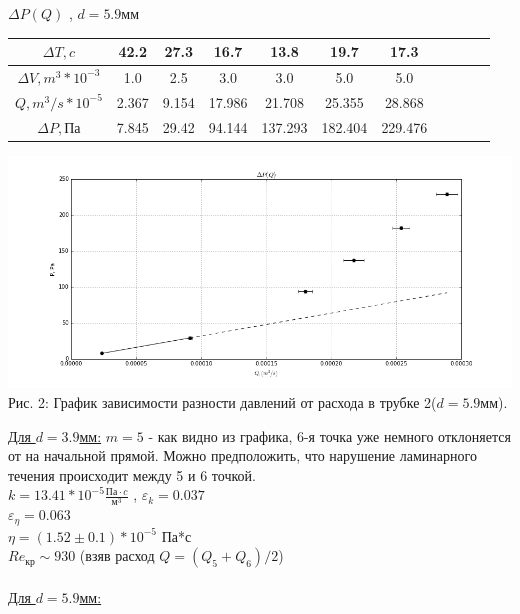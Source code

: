\documentclass[10pt]{article}
\begin{document}
\begin{enumerate}
            \begin{table}[h]
                    \begin{center}
                    $\Delta P (Q)$ , $d = 5.9$мм\\
                    \begin{tabular}{|c|c|c|c|c|c|c|c|c|c|c|}
                            \hline
                                $\Delta T , c$ & 42.2& 27.3& 16.7& 13.8& 19.7& 17.3\\
                            \hline
                                 $\Delta V , m^3 * 10^{-3}$  & 1.0& 2.5& 3.0& 3.0& 5.0& 5.0\\
                            \hline
                                $Q , m^3/s * 10^{-5}$ &2.367&9.154&17.986&21.708&25.355&28.868\\
                            \hline
                                $\Delta P , \text{Па}$ &7.845&29.42&94.144&137.293&182.404&229.476\\
                            \hline
                            \end{tabular}
                        
                            \includegraphics[width=15cm]{g2mm.png}
                            \\ Рис. 2: График зависимости разности давлений от расхода в трубке 2($d = 5.9$мм).
                    \end{center}
                    \end{table}
    \underline{Для $d = 3.9$мм:}
        \indent $m = 5$ - как видно из графика, 6-я точка уже немного отклоняется от на начальной прямой. Можно предположить, что нарушение ламинарного течения происходит между 5 и 6 точкой. \\
        \indent $k = 13.41 * 10^{-5} \frac{\text{Па}\cdot c}{\text{м}^3}$ , $\varepsilon_k = 0.037$ \\
        \indent $\varepsilon_{\eta} = 0.063$ \\
        \indent $\eta = (1.52 \pm 0.1) * 10^{-5}$ Па*с \\
        \indent $Re_{\text{кр}} \sim  930$ (взяв расход $ Q = (Q_5 + Q_6)/2$)
        \\ \\
    \underline{Для $d = 5.9$мм:}
        

\end{enumerate}
\end{document}
